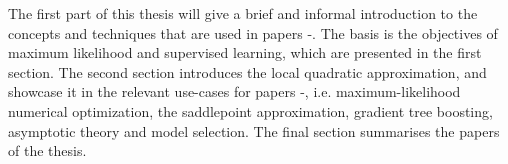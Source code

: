 The first part of this thesis will give a brief and informal introduction to the concepts and techniques that are used in papers -.
The basis is the objectives of maximum likelihood and supervised learning, which are presented in the first section.
The second section introduces the local quadratic approximation, and showcase it in the relevant use-cases for papers -, i.e. maximum-likelihood numerical optimization, the saddlepoint approximation, gradient tree boosting, asymptotic theory and model selection.
The final section summarises the papers of the thesis.
%
%
%
%
%
%
%
%
%
%
%








